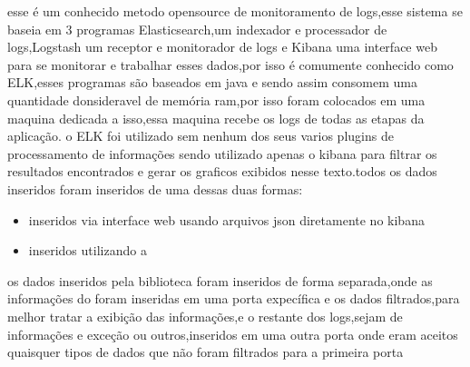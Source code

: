 \documentclass[
	12pt,				%
	openright,			%
	oneside,			%
	a4paper,			%
	english,			%
	french,				%
	spanish,			%
	brazil,				%
	]{abntex2}
\begin{document}
esse é um conhecido metodo opensource de monitoramento de logs,esse sistema se baseia em 3 programas Elasticsearch,um indexador e processador de logs,Logstash um receptor e monitorador de logs e Kibana uma interface web para se monitorar e trabalhar esses dados,por isso é comumente conhecido como ELK,esses programas são baseados em java e sendo assim consomem uma quantidade donsideravel de memória ram,por isso foram colocados em uma maquina dedicada a isso,essa maquina recebe os logs de todas as etapas da aplicação.
o ELK foi utilizado sem nenhum dos seus varios plugins de processamento de informações sendo utilizado apenas o kibana para filtrar os resultados encontrados e gerar os graficos exibidos nesse texto.todos os dados inseridos foram inseridos de uma dessas duas formas:
\begin{itemize}
 \item inseridos via interface web usando arquivos json diretamente no kibana
 \item inseridos utilizando a 
\end{itemize}
os dados inseridos pela biblioteca  foram inseridos de forma separada,onde as informações do  foram inseridas em uma porta expecífica e os dados filtrados,para melhor tratar a exibição das informações,e o restante dos logs,sejam de informações e exceção ou outros,inseridos em uma outra porta onde eram aceitos quaisquer tipos de dados que não foram filtrados para a primeira porta
\end{document}
